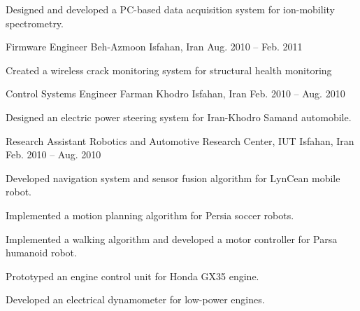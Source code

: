 \begin{cventries}
{\begin{cvitems}
        \item Designed and developed a PC-based data acquisition system for ion-mobility spectrometry.
      \end{cvitems}
    }
  \cventry
    {Firmware Engineer}
    {Beh-Azmoon}
    {Isfahan, Iran}
    {Aug. 2010 -- Feb. 2011}
    {
      \begin{cvitems}
        \item Created a wireless crack monitoring system for structural health monitoring %
      \end{cvitems}
    }
  \cventry
    {Control Systems Engineer}
    {Farman Khodro}
    {Isfahan, Iran}
    {Feb. 2010 -- Aug. 2010}
    {
      \begin{cvitems}
        \item Designed an electric power steering system for Iran-Khodro Samand automobile.
      \end{cvitems}
    }
  \cventry
    {Research Assistant}
    {Robotics and Automotive Research Center, IUT}
    {Isfahan, Iran}
    {Feb. 2010 -- Aug. 2010}
    {
      \begin{cvitems}
        \item Developed navigation system and sensor fusion algorithm for LynCean mobile robot.
        \item Implemented a motion planning algorithm for Persia soccer robots.
        \item Implemented a walking algorithm and developed a motor controller for Parsa humanoid robot.
        \item Prototyped an engine control unit for Honda GX35 engine.
        \item Developed an electrical dynamometer for low-power engines.
      \end{cvitems}
    }
\end{cventries} 